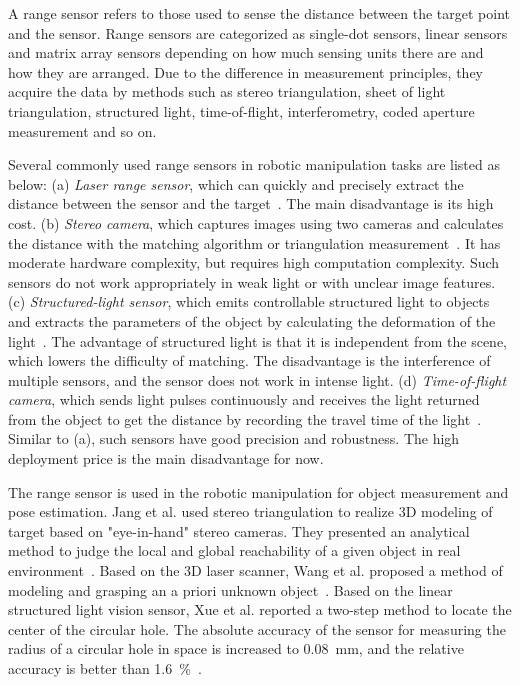 \documentclass[journal,twoside,web]{ieeecolor}
\begin{document}
A range sensor refers to those used to sense the distance between the target point and the sensor. 
Range sensors are categorized as single-dot sensors, linear sensors and matrix array sensors depending on how much sensing units there are and how they are arranged.
Due to the difference in measurement principles, they acquire the data by methods such as stereo triangulation, sheet of light triangulation, structured light, time-of-flight, interferometry, coded aperture measurement and so on.

Several commonly used range sensors in robotic manipulation tasks are listed as below: 
(a) \textit{Laser range sensor}, which can quickly and precisely extract the distance between the sensor and the target~\cite{Aleotti2014,Fur2018}. The main disadvantage is its high cost. 
(b) \textit{Stereo camera}, which captures images using two cameras and calculates the distance with the matching algorithm or triangulation measurement~\cite{Hu2016,Zhang2017,Pachtrachai2018,Deniz2018}. It has moderate hardware complexity, but requires high computation complexity. Such sensors do not work appropriately in weak light or with unclear image features. 
(c) \textit{Structured-light sensor}, which emits controllable structured light to objects and extracts the parameters of the object by calculating the deformation of the light~\cite{Yang2017,Tran2017,Wieghardt2017,Anwar2017,Yu2018}. The advantage of structured light is that it is independent from the scene, which lowers the difficulty of matching. The disadvantage is the interference of multiple sensors, and the sensor does not work in intense light. 
(d) \textit{Time-of-flight camera}, which sends light pulses continuously and receives the light returned from the object to get the distance by recording the travel time of the light~\cite{Pan2016,Santos2018,Du2018,Lin2018,Han2018}. Similar to (a), such sensors have good precision and robustness. The high deployment price is the main disadvantage for now.
 
The range sensor is used in the robotic manipulation for object measurement and pose estimation. 
Jang et al. used stereo triangulation to realize 3D modeling of target based on "eye-in-hand" stereo cameras. They presented an analytical method to judge the local and global reachability of a given object in real environment~\cite{Jang05}. 
Based on the 3D laser scanner, Wang et al. proposed a method of modeling and grasping an a priori unknown object~\cite{Wang05}. 
Based on the linear structured light vision sensor, Xue et al. reported a two-step method to locate the center of the circular hole. 
The absolute accuracy of the sensor for measuring the radius of a circular hole in space is increased to \SI{0.08}{\milli\meter}, and the relative accuracy is better than \SI{1.6}{\percent}~\cite{Xue2008}.
\end{document}
